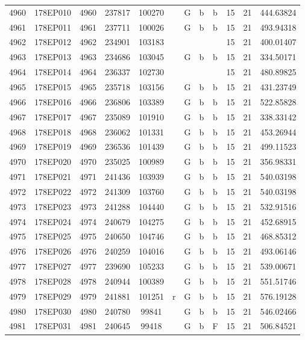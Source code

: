 \begin{tabular}{|*{12}{c|}}
4960 & 178EP010 & 4960 & 237817 & 100270 &  & G & b & b & 15 & 21 & 444.63824 \\ 
4961 & 178EP011 & 4961 & 237711 & 100026 &  & G & b & b & 15 & 21 & 493.94318 \\ 
4962 & 178EP012 & 4962 & 234901 & 103183 &  &  &  &  & 15 & 21 & 400.01407 \\ 
4963 & 178EP013 & 4963 & 234686 & 103045 &  & G & b & b & 15 & 21 & 334.50171 \\ 
4964 & 178EP014 & 4964 & 236337 & 102730 &  &  &  &  & 15 & 21 & 480.89825 \\ 
4965 & 178EP015 & 4965 & 235718 & 103156 &  & G & b & b & 15 & 21 & 431.23749 \\ 
4966 & 178EP016 & 4966 & 236806 & 103389 &  & G & b & b & 15 & 21 & 522.85828 \\ 
4967 & 178EP017 & 4967 & 235089 & 101910 &  & G & b & b & 15 & 21 & 338.33142 \\ 
4968 & 178EP018 & 4968 & 236062 & 101331 &  & G & b & b & 15 & 21 & 453.26944 \\ 
4969 & 178EP019 & 4969 & 236536 & 101439 &  & G & b & b & 15 & 21 & 499.11523 \\ 
4970 & 178EP020 & 4970 & 235025 & 100989 &  & G & b & b & 15 & 21 & 356.98331 \\ 
4971 & 178EP021 & 4971 & 241436 & 103939 &  & G & b & b & 15 & 21 & 540.03198 \\ 
4972 & 178EP022 & 4972 & 241309 & 103760 &  & G & b & b & 15 & 21 & 540.03198 \\ 
4973 & 178EP023 & 4973 & 241288 & 104440 &  & G & b & b & 15 & 21 & 532.91516 \\ 
4974 & 178EP024 & 4974 & 240679 & 104275 &  & G & b & b & 15 & 21 & 452.68915 \\ 
4975 & 178EP025 & 4975 & 240650 & 104746 &  & G & b & b & 15 & 21 & 468.85312 \\ 
4976 & 178EP026 & 4976 & 240259 & 104016 &  & G & b & b & 15 & 21 & 493.06146 \\ 
4977 & 178EP027 & 4977 & 239690 & 105233 &  & G & b & b & 15 & 21 & 539.00671 \\ 
4978 & 178EP028 & 4978 & 240944 & 100389 &  & G & b & b & 15 & 21 & 551.51746 \\ 
4979 & 178EP029 & 4979 & 241881 & 101251 & r & G & b & b & 15 & 21 & 576.19128 \\ 
4980 & 178EP030 & 4980 & 240780 & 99841 &  & G & b & b & 15 & 21 & 546.02466 \\ 
4981 & 178EP031 & 4981 & 240645 & 99418 &  & G & b & F & 15 & 21 & 506.84521 \\ 

\end{tabular}
